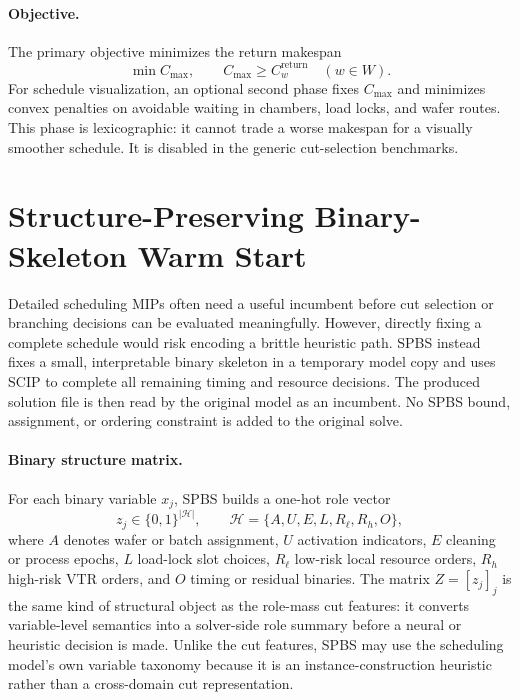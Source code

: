 \documentclass[letterpaper]{article}
\begin{document}
\paragraph{Objective.}
The primary objective minimizes the return makespan
\begin{equation}
\min C_{\max},\qquad
C_{\max}\ge C^{\mathrm{return}}_w\quad (w\in W).
\end{equation}
For schedule visualization, an optional second phase fixes $C_{\max}$ and minimizes convex penalties on avoidable waiting in chambers, load locks, and wafer routes.
This phase is lexicographic: it cannot trade a worse makespan for a visually smoother schedule.
It is disabled in the generic cut-selection benchmarks.

\section{Structure-Preserving Binary-Skeleton Warm Start}

Detailed scheduling MIPs often need a useful incumbent before cut selection or branching decisions can be evaluated meaningfully.
However, directly fixing a complete schedule would risk encoding a brittle heuristic path.
SPBS instead fixes a small, interpretable binary skeleton in a temporary model copy and uses SCIP to complete all remaining timing and resource decisions.
The produced solution file is then read by the original model as an incumbent.
No SPBS bound, assignment, or ordering constraint is added to the original solve.

\paragraph{Binary structure matrix.}
For each binary variable $x_j$, SPBS builds a one-hot role vector
\[
z_j\in\{0,1\}^{|\mathcal H|},\qquad
\mathcal H=\{A,U,E,L,R_{\ell},R_h,O\},
\]
where $A$ denotes wafer or batch assignment, $U$ activation indicators, $E$ cleaning or process epochs, $L$ load-lock slot choices, $R_{\ell}$ low-risk local resource orders, $R_h$ high-risk VTR orders, and $O$ timing or residual binaries.
The matrix $Z=[z_j]_j$ is the same kind of structural object as the role-mass cut features: it converts variable-level semantics into a solver-side role summary before a neural or heuristic decision is made.
Unlike the cut features, SPBS may use the scheduling model's own variable taxonomy because it is an instance-construction heuristic rather than a cross-domain cut representation.
\end{document}
